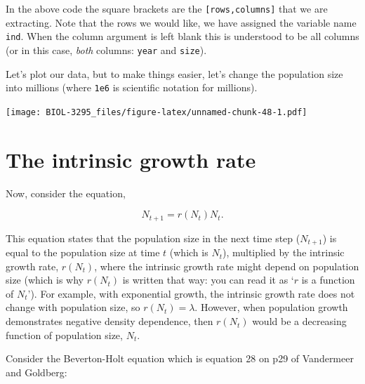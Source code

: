 \documentclass[]{book}
\newenvironment{Shaded}{\begin{snugshade}}{\end{snugshade}}
\newcommand{\KeywordTok}[1]{\textcolor[rgb]{0.13,0.29,0.53}{\textbf{{#1}}}}
\newcommand{\DataTypeTok}[1]{\textcolor[rgb]{0.13,0.29,0.53}{{#1}}}
\newcommand{\FloatTok}[1]{\textcolor[rgb]{0.00,0.00,0.81}{{#1}}}
\newcommand{\StringTok}[1]{\textcolor[rgb]{0.31,0.60,0.02}{{#1}}}
\newcommand{\NormalTok}[1]{{#1}}
\begin{document}
In the above code the square brackets are the
\texttt{{[}rows,columns{]}} that we are extracting. Note that the rows
we would like, we have assigned the variable name \texttt{ind}. When the
column argument is left blank this is understood to be all columns (or
in this case, \emph{both} columns: \texttt{year} and \texttt{size}).

Let's plot our data, but to make things easier, let's change the
population size into millions (where \texttt{1e6} is scientific notation
for millions).

\begin{Shaded}
\end{Shaded}

\texttt{[image: BIOL-3295\_files/figure-latex/unnamed-chunk-48-1.pdf]}

\section{The intrinsic growth rate}\label{the-intrinsic-growth-rate}

Now, consider the equation,

\begin{equation}
N_{t+1} = r(N_t)N_t.
\label{eq:R}
\end{equation}

This equation states that the population size in the next time step
(\(N_{t+1}\)) is equal to the population size at time \(t\) (which is
\(N_t\)), multiplied by the intrinsic growth rate, \(r(N_t)\), where the
intrinsic growth rate might depend on population size (which is why
\(r(N_t)\) is written that way: you can read it as `\(r\) is a function
of \(N_t\)'). For example, with exponential growth, the intrinsic growth
rate does not change with population size, so \(r(N_t) = \lambda\).
However, when population growth demonstrates negative density
dependence, then \(r(N_t)\) would be a decreasing function of population
size, \(N_t\).

Consider the Beverton-Holt equation which is equation 28 on p29 of
Vandermeer and Goldberg:
\end{document}
